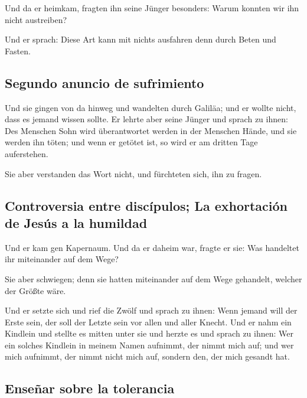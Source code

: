  Und da er heimkam, fragten ihn seine Jünger besonders:
Warum konnten wir ihn nicht austreiben?

 Und er sprach: Diese Art kann mit nichts ausfahren denn
durch Beten und Fasten.

\hypertarget{segundo-anuncio-de-sufrimiento}{%
\subsection{Segundo anuncio de
sufrimiento}\label{segundo-anuncio-de-sufrimiento}}

 Und sie gingen von da hinweg und wandelten durch
Galiläa; und er wollte nicht, dass es jemand wissen sollte.
 Er lehrte aber seine Jünger und sprach zu ihnen: Des
Menschen Sohn wird überantwortet werden in der Menschen Hände, und sie
werden ihn töten; und wenn er getötet ist, so wird er am dritten Tage
auferstehen.

 Sie aber verstanden das Wort nicht, und fürchteten sich,
ihn zu fragen.

\hypertarget{controversia-entre-discuxedpulos-la-exhortaciuxf3n-de-jesuxfas-a-la-humildad}{%
\subsection{Controversia entre discípulos; La exhortación de Jesús a la
humildad}\label{controversia-entre-discuxedpulos-la-exhortaciuxf3n-de-jesuxfas-a-la-humildad}}

 Und er kam gen Kapernaum. Und da er daheim war, fragte
er sie: Was handeltet ihr miteinander auf dem Wege?

 Sie aber schwiegen; denn sie hatten miteinander auf dem
Wege gehandelt, welcher der Größte wäre.

 Und er setzte sich und rief die Zwölf und sprach zu
ihnen: Wenn jemand will der Erste sein, der soll der Letzte sein vor
allen und aller Knecht.  Und er nahm ein Kindlein und
stellte es mitten unter sie und herzte es und sprach zu ihnen:
 Wer ein solches Kindlein in meinem Namen aufnimmt, der
nimmt mich auf; und wer mich aufnimmt, der nimmt nicht mich auf, sondern
den, der mich gesandt hat.

\hypertarget{enseuxf1ar-sobre-la-tolerancia}{%
\subsection{Enseñar sobre la
tolerancia}\label{enseuxf1ar-sobre-la-tolerancia}}

